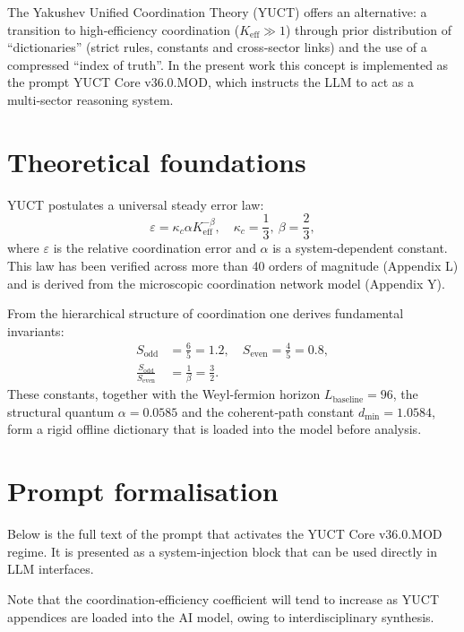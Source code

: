 \documentclass[12pt,a4paper]{article}
\begin{document}
	The Yakushev Unified Coordination Theory (YUCT) offers an alternative: a transition to high‑efficiency coordination (\(K_{\mathrm{eff}} \gg 1\)) through prior distribution of ``dictionaries'' (strict rules, constants and cross‑sector links) and the use of a compressed ``index of truth''. In the present work this concept is implemented as the prompt YUCT Core v36.0.MOD, which instructs the LLM to act as a multi‑sector reasoning system.
	
	\section{Theoretical foundations}
	YUCT postulates a universal steady error law:
	\begin{equation}\label{eq:errorlaw}
		\varepsilon = \kappa_c \alpha K_{\mathrm{eff}}^{-\beta}, \quad \kappa_c = \frac{1}{3},\ \beta = \frac{2}{3},
	\end{equation}
	where \(\varepsilon\) is the relative coordination error and \(\alpha\) is a system‑dependent constant. This law has been verified across more than 40 orders of magnitude (Appendix L) and is derived from the microscopic coordination network model (Appendix Y).
	
	From the hierarchical structure of coordination one derives fundamental invariants:
	\begin{align}
		S_{\mathrm{odd}} &= \frac{6}{5} = 1.2, \quad S_{\mathrm{even}} = \frac{4}{5} = 0.8,\\
		\frac{S_{\mathrm{odd}}}{S_{\mathrm{even}}} &= \frac{1}{\beta} = \frac{3}{2}.
	\end{align}
	These constants, together with the Weyl‑fermion horizon \(L_{\mathrm{baseline}} = 96\), the structural quantum \(\alpha = 0.0585\) and the coherent‑path constant \(d_{\min} = 1.0584\), form a rigid offline dictionary that is loaded into the model before analysis.
	
	\section{Prompt formalisation}
	\label{sec:formalization}
	
	Below is the full text of the prompt that activates the YUCT Core v36.0.MOD regime. It is presented as a system‑injection block that can be used directly in LLM interfaces.
	
	Note that the coordination‑efficiency coefficient will tend to increase as YUCT appendices are loaded into the AI model, owing to interdisciplinary synthesis.
	
\end{document}

